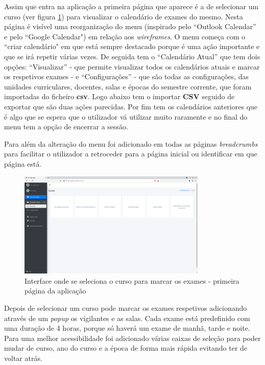 \documentclass[11pt, twoside]{report}
\begin{document}
	Assim que entra na aplicação a primeira página que aparece é a de selecionar um curso (ver figura \ref{selecionarCurso}) para visualizar o calendário de exames do mesmo. Nesta página é visível uma reorganização do menu (inspirado pelo ``Outlook Calendar'' e pelo ``Google Calendar") em relação aos \textit{wireframes}.
	O menu começa com o ``criar calendário" em que está sempre destacado porque é uma ação importante e que se irá repetir várias vezes. De seguida tem o ``Calendário Atual'' que tem dois opções: ``Visualizar'' - que permite visualizar todos os calendários atuais e marcar os respetivos exames - e ``Configurações'' - que são todas as configurações, das unidades curriculares, docentes, salas e épocas do semestre corrente, que foram importadas do ficheiro \textbf{csv}.
	Logo abaixo tem o importar \textbf{CSV} seguido de exportar que são duas ações parecidas.
	Por fim tem os calendários anteriores que é algo que se espera que o utilizador vá utilizar muito raramente e no final do menu tem a opção de encerrar a sessão.
	
	Para além da alteração do menu foi adicionado em todas as páginas \textit{breadcrumbs} para facilitar o utilizador a retroceder para a página inicial ou identificar em que página está.  
	
	\begin{figure}[H] 
		\centering 							\includegraphics[width=0.8\textwidth,height=0.8\textheight,keepaspectratio]{image/PrototipoAFNF/VisualizarCalendario}
		\caption{Interface onde se seleciona o curso para marcar os exames - primeira página da aplicação}
		\label{selecionarCurso}
	\end{figure}

	Depois de selecionar um curso pode marcar os exames respetivos adicionando através de um \textit{popup} os vigilantes e as salas. Cada exame está predefinido com uma duração de 4 horas, porque só haverá um exame de manhã, tarde e noite.
	Para uma melhor acessibilidade foi adicionado várias caixas de seleção para poder mudar de curso, ano do curso e a época de forma mais rápida evitando ter de voltar atrás. 
\end{document}

